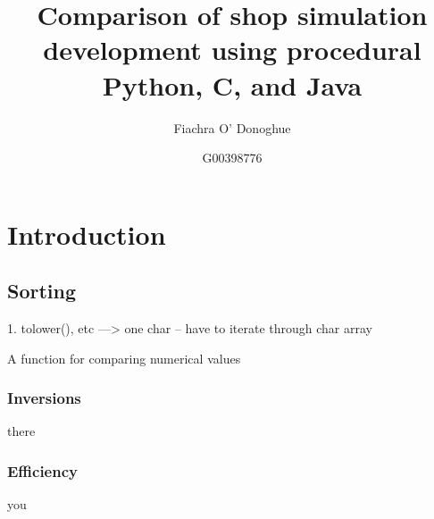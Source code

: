\documentclass[12pt, a4paper]{article}
\title{Comparison of shop simulation development using procedural Python, C, and Java}
\author{Fiachra O' Donoghue}
\date{%
    G00398776\\%
}
\begin{document}
\maketitle

\section{Introduction}

\subsection{Sorting}

1. tolower(), etc ---> one char -- have to iterate through char array

\begin{algorithm}[H]
    \caption{A function for comparing numerical values}\label{comparator}
    \begin{algorithmic}[1]
     
    \EndIf
     
    \EndIf
     
    \EndIf
    \EndProcedure
    \end{algorithmic}
\end{algorithm}

\subsubsection{Inversions}
there


\subsubsection{Efficiency}

you


\clearpage
\end{document}
